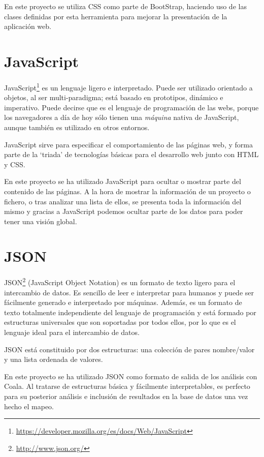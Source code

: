\documentclass[a4paper, 12pt]{book}
\begin{document}
En este proyecto se utiliza CSS como parte de BootStrap, haciendo uso de las clases definidas por esta herramienta para mejorar la presentación de la aplicación web.

\section{JavaScript} 
\label{sec:seccion9}
JavaScript\footnote{\url{https://developer.mozilla.org/es/docs/Web/JavaScript}} es un lenguaje ligero e interpretado. Puede ser utilizado orientado a objetos, al ser multi-paradigma; está basado en prototipos, dinámico e imperativo. Puede decirse que es el lenguaje de programación de las webs, porque los navegadores a día de hoy sólo tienen una \emph{máquina} nativa de JavaScript, aunque también es utilizado en otros entornos.

JavaScript sirve para especificar el comportamiento de las páginas web, y forma parte de la `triada' de tecnologías básicas para el desarrollo web junto con HTML y CSS.~\cite{flanagan:_js}

En este proyecto se ha utilizado JavaScript para ocultar o mostrar parte del contenido de las páginas. A la hora de mostrar la información de un proyecto o fichero, o tras analizar una lista de ellos, se presenta toda la información del mismo y gracias a JavaScript podemos ocultar parte de los datos para poder tener una visión global.

\section{JSON} 
\label{sec:seccion10}
JSON\footnote{\url{http://www.json.org/}} (JavaScript Object Notation) es un formato de texto ligero para el intercambio de datos. Es sencillo de leer e interpretar para humanos y puede ser fácilmente generado e interpretado por máquinas. Además, es un formato de texto totalmente independiente del lenguaje de programación y está formado por estructuras universales que son soportadas por todos ellos, por lo que es el lenguaje ideal para el intercambio de datos.

JSON está constituido por dos estructuras: una colección de pares nombre/valor y una lista ordenada de valores.

En este proyecto se ha utilizado JSON como formato de salida de los análisis con Coala. Al tratarse de estructuras básica y fácilmente interpretables, es perfecto para su posterior análisis e inclusión de resultados en la base de datos una vez hecho el mapeo.
\end{document}
